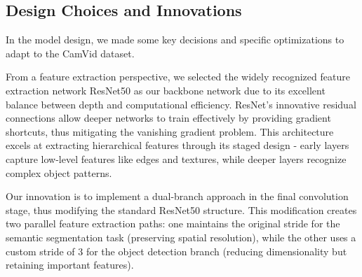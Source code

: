 \documentclass[conference]{IEEEtran}
\begin{document}
\subsection{Design Choices and Innovations}




In the model design, we made some key decisions and specific optimizations to adapt to the CamVid dataset.

From a feature extraction perspective, we selected the widely recognized feature extraction network ResNet50 as our backbone network due to its excellent balance between depth and computational efficiency. ResNet's innovative residual connections allow deeper networks to train effectively by providing gradient shortcuts, thus mitigating the vanishing gradient problem. This architecture excels at extracting hierarchical features through its staged design - early layers capture low-level features like edges and textures, while deeper layers recognize complex object patterns.

Our innovation is to implement a dual-branch approach in the final convolution stage, thus modifying the standard ResNet50 structure. This modification creates two parallel feature extraction paths: one maintains the original stride for the semantic segmentation task (preserving spatial resolution), while the other uses a custom stride of 3 for the object detection branch (reducing dimensionality but retaining important features).


\end{document}
